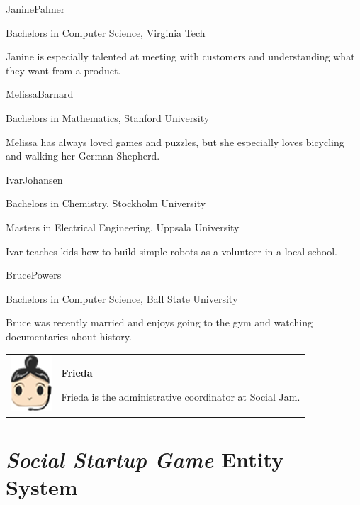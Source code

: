 \documentclass[letterpaper]{article}
\begin{document}
\begin{character}{Janine}{Palmer}
{\item Bachelors in Computer Science, Virginia Tech}
Janine is especially talented at meeting with customers and understanding what they want from a product.
\end{character}

\begin{character}{Melissa}{Barnard}
{\item Bachelors in Mathematics, Stanford University}
Melissa has always loved games and puzzles, but she especially loves bicycling and walking her German Shepherd.
\end{character}

\begin{character}{Ivar}{Johansen}
{\item Bachelors in Chemistry, Stockholm University
 \item Masters in Electrical Engineering, Uppsala University}
Ivar teaches kids how to build simple robots as a volunteer in a local school.
\end{character}

\begin{character}{Bruce}{Powers}
{\item Bachelors in Computer Science, Ball State University}
Bruce was recently married and enjoys going to the gym and watching documentaries about history.
\end{character}

\begin{tabular}{p{1.25in}p{4in}}
\includegraphics[width=0.6in]{images/Frieda.png}
&
\textbf{Frieda}

Frieda is the administrative coordinator at Social Jam.
\end{tabular}

\clearpage
\section{\textit{Social Startup Game} Entity System}
\label{appendix:entity-system}
\end{document}
